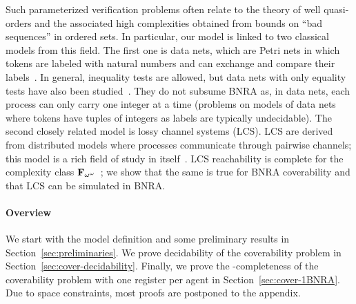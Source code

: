 Such parameterized verification problems often relate to the theory of well quasi-orders
and the associated high complexities obtained from bounds on ``bad sequences'' in ordered sets. In particular, our model is linked to two classical models from this field. The first one is data nets, which are Petri nets in which tokens are labeled with natural numbers and can exchange and compare their labels~\cite{LazicNORW08}. In general, inequality tests are allowed, but data nets with only equality tests have also been studied~\cite{Rosa-Velardo17}. They do not subsume BNRA as, in data nets, each process can only carry one integer at a time (problems on models of data nets where tokens have tuples of integers as labels are typically undecidable).
The second closely related model is lossy channel systems (LCS)\cite{AbdullaJ1996verif}. LCS are derived from distributed models where processes communicate through pairwise channels; this model is a rich field of study in itself~\cite{Aiswarya2015model,Aiswarya2020networks}. LCS reachability is complete for the complexity class $\mathbf{F}_{\omega^\omega}$~\cite{ChambartS08ordinal, Schnoebelen2002verifying}; we show that the same is true for BNRA coverability and that LCS can be simulated in BNRA.

\paragraph*{Overview}
We start with the model definition and some preliminary results in Section~\ref{sec:preliminaries}. We prove decidability of the coverability problem in Section~\ref{sec:cover-decidability}. 
Finally, we prove the \NP-completeness of the coverability problem with one register per agent in Section~\ref{sec:cover-1BNRA}.
Due to space constraints, most proofs are postponed to the appendix.

